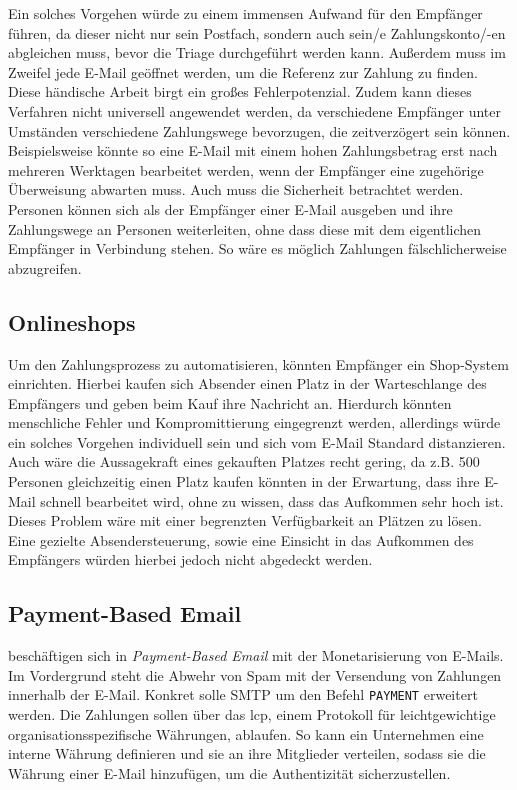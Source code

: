 Ein solches Vorgehen würde zu einem immensen Aufwand für den Empfänger führen, da dieser nicht nur sein Postfach, sondern auch sein/e Zahlungskonto/-en abgleichen muss, bevor die Triage durchgeführt werden kann. Außerdem muss im Zweifel jede E-Mail geöffnet werden, um die Referenz zur Zahlung zu finden. Diese händische Arbeit birgt ein großes Fehlerpotenzial. Zudem kann dieses Verfahren nicht universell angewendet werden, da verschiedene Empfänger unter Umständen verschiedene Zahlungswege bevorzugen, die zeitverzögert sein können. Beispielsweise könnte so eine E-Mail mit einem hohen Zahlungsbetrag erst nach mehreren Werktagen bearbeitet werden, wenn der Empfänger eine zugehörige Überweisung abwarten muss. Auch muss die Sicherheit betrachtet werden. Personen können sich als der Empfänger einer E-Mail ausgeben und ihre Zahlungswege an Personen weiterleiten, ohne dass diese mit dem eigentlichen Empfänger in Verbindung stehen. So wäre es möglich Zahlungen fälschlicherweise abzugreifen.

\subsection{Onlineshops}
Um den Zahlungsprozess zu automatisieren, könnten Empfänger ein Shop-System einrichten. Hierbei kaufen sich Absender einen Platz in der Warteschlange des Empfängers und geben beim Kauf ihre Nachricht an. Hierdurch könnten menschliche Fehler und Kompromittierung eingegrenzt werden, allerdings würde ein solches Vorgehen individuell sein und sich vom E-Mail Standard distanzieren. Auch wäre die Aussagekraft eines gekauften Platzes recht gering, da z.B. 500 Personen gleichzeitig einen Platz kaufen könnten in der Erwartung, dass ihre E-Mail schnell bearbeitet wird, ohne zu wissen, dass das Aufkommen sehr hoch ist. Dieses Problem wäre mit einer begrenzten Verfügbarkeit an Plätzen zu lösen. Eine gezielte Absendersteuerung, sowie eine Einsicht in das Aufkommen des Empfängers würden hierbei jedoch nicht abgedeckt werden.

\subsection{Payment-Based Email}
\label{Payment-Based_Email}
\cite{Turner2003} beschäftigen sich in \textit{Payment-Based Email} mit der Monetarisierung von E-Mails. Im Vordergrund steht die Abwehr von Spam mit der Versendung von Zahlungen innerhalb der E-Mail. Konkret solle SMTP um den Befehl \texttt{PAYMENT} erweitert werden. Die Zahlungen sollen über das \acrfull{lcp}, einem Protokoll für leichtgewichtige organisationsspezifische Währungen, ablaufen. So kann ein Unternehmen eine interne Währung definieren und sie an ihre Mitglieder verteilen, sodass sie die Währung einer E-Mail hinzufügen, um die Authentizität sicherzustellen.


